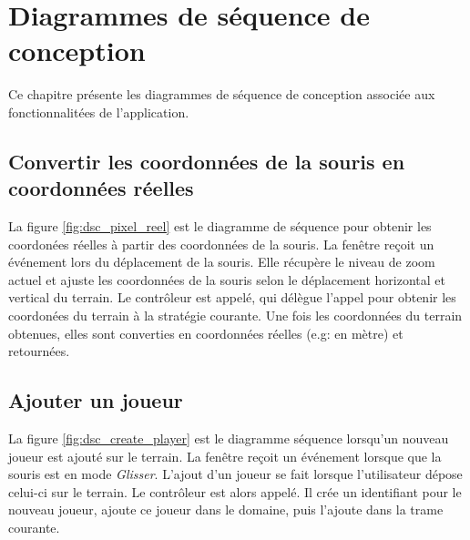 
\chapter{Diagrammes de séquence de conception}
\label{s:sequence_conception}

Ce chapitre présente les diagrammes de séquence de conception associée aux fonctionnalitées de l'application.

\section{Convertir les coordonnées de la souris en coordonnées réelles}
\label{sec:convertir_coordonnees_souris}


La figure \ref{fig:dsc_pixel_reel} est le diagramme de séquence pour obtenir les coordonées réelles à partir des coordonnées de la souris.
La fenêtre reçoit un événement lors du déplacement de la souris.
Elle récupère le niveau de zoom actuel et ajuste les coordonnées de la souris selon le déplacement horizontal et vertical du terrain.
Le contrôleur est appelé, qui délègue l'appel pour obtenir les coordonées du terrain à la stratégie courante.
Une fois les coordonnées du terrain obtenues, elles sont converties en coordonnées réelles (e.g: en mètre) et retournées.


\section{Ajouter un joueur}
\label{sec:ajouter_joueur}


La figure \ref{fig:dsc_create_player} est le diagramme séquence lorsqu'un nouveau joueur est ajouté sur le terrain.
La fenêtre reçoit un événement lorsque que la souris est en mode \textit{Glisser}.
L'ajout d'un joueur se fait lorsque l'utilisateur dépose celui-ci sur le terrain.
Le contrôleur est alors appelé.
Il crée un identifiant pour le nouveau joueur, ajoute ce joueur dans le domaine, puis l'ajoute dans la trame courante.


